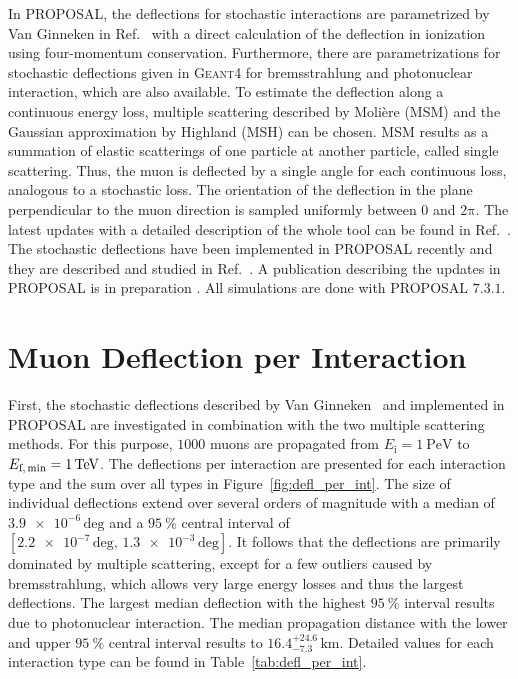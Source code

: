 In PROPOSAL, the deflections for stochastic interactions are parametrized by Van Ginneken 
in Ref.~\cite{Van_Ginneken} with a direct calculation of the deflection in 
ionization using four-momentum conservation. 
Furthermore, there are parametrizations for stochastic deflections given in \textsc{Geant4} \cite{GEANT4_standard, GEANT4} 
for bremsstrahlung and photonuclear interaction, which 
are also available.
To estimate the deflection along 
a continuous energy loss, multiple scattering described by Molière 
(MSM) \cite{moliere_scattering} and the Gaussian approximation by 
Highland (MSH) \cite{HIGHLAND_1975}
can be chosen. 
MSM results as a summation of elastic scatterings of one particle 
at another particle, called single scattering. Thus, the muon is deflected by a 
single angle for each continuous loss, analogous to a stochastic loss.
The orientation of the deflection in the plane perpendicular to the muon direction is 
sampled uniformly between $0$ and $2\mathrm{\pi}$.
The latest updates with a detailed description of the whole tool can be found 
in Ref.~\cite{phd_soedingrekso}. 
The stochastic deflections have been implemented in PROPOSAL recently and they are 
described and studied in Ref.~\cite{Gutjahr_2021}.
A publication describing the 
updates in PROPOSAL is in preparation 
\cite{alameddine_et_al}.
All simulations are done with PROPOSAL $7.3.1$.

\section{Muon Deflection per Interaction}\label{sec:defl_per_int}
First, the stochastic deflections described by Van Ginneken~\cite{Van_Ginneken} 
and implemented 
in PROPOSAL are investigated in combination with the two multiple scattering methods. 
For this purpose, $\num{1000}$ muons are propagated from $E_{\text{i}} = \SI{1}{\peta\electronvolt}$ to $E_{\text{f,\,min}} = \SI{1}{\tera\electronvolt}$.
The deflections per interaction are presented 
for each interaction type and the sum over all types in Figure~\ref{fig:defl_per_int}. 
The size of individual deflections 
extend over several orders of magnitude with a median of $\num{3.9e-6}\,\text{deg}$
and a $\SI{95}{\percent}$ central interval of $[\num{2.2e-7}\,\text{deg}, \,\num{1.3e-3}\,\text{deg}]$. 
It follows that the deflections are primarily dominated by multiple scattering, except for a few outliers caused by bremsstrahlung, which 
allows very large energy losses and thus the largest deflections. 
The largest median deflection with the highest $\SI{95}{\percent}$ interval results due to photonuclear interaction.
The median propagation distance with the lower and upper $\SI{95}{\percent}$ 
central interval results to $16.4_{-7.3}^{+24.6}\,\si{\kilo\meter}$.
Detailed values for each interaction type can be found in Table~\ref{tab:defl_per_int}.

